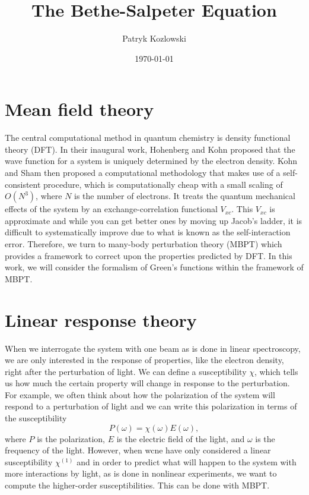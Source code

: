 \documentclass[12pt]{article}
\title{The Bethe-Salpeter Equation}
\author{Patryk Kozlowski}
\date{\today}
\begin{document}
\maketitle
\section{Mean field theory}
The central computational method in quantum chemistry is density functional theory (DFT). In their inaugural work, Hohenberg and Kohn proposed that the wave function for a system is uniquely determined by the electron density. Kohn and Sham then proposed a computational methodology that makes use of a self-consistent procedure, which is computationally cheap with a small scaling of $O(N^3)$, where $N$ is the number of electrons. It treats the quantum mechanical effects of the system by an exchange-correlation functional $V_{xc}$. This $V_{xc}$ is approximate and while you can get better ones by moving up Jacob's ladder, it is difficult to systematically improve due to what is known as the self-interaction error. Therefore, we turn to many-body perturbation theory (MBPT) which provides a framework to correct upon the properties predicted by DFT. In this work, we will consider the formalism of Green's functions within the framework of MBPT.
\section{Linear response theory}
When we interrogate the system with one beam as is done in linear spectroscopy, we are only interested in the response of properties, like the electron density, right after the perturbation of light. We can define a susceptibility $\chi$, which tells us how much the certain property will change in response to the perturbation. For example, we often think about how the polarization of the system will respond to a perturbation of light and we can write this polarization in terms of the susceptibility
\begin{equation}
P(\omega) = \chi(\omega)E(\omega),
\end{equation}
where $P$ is the polarization, $E$ is the electric field of the light, and $\omega$ is the frequency of the light. However, when wcne have only considered a linear susceptibility $\chi^{(1)}$ and in order to predict what will happen to the system with more interactions by light, as is done in nonlinear experiments, we want to compute the higher-order susceptibilities. This can be done with MBPT.
\end{document}

